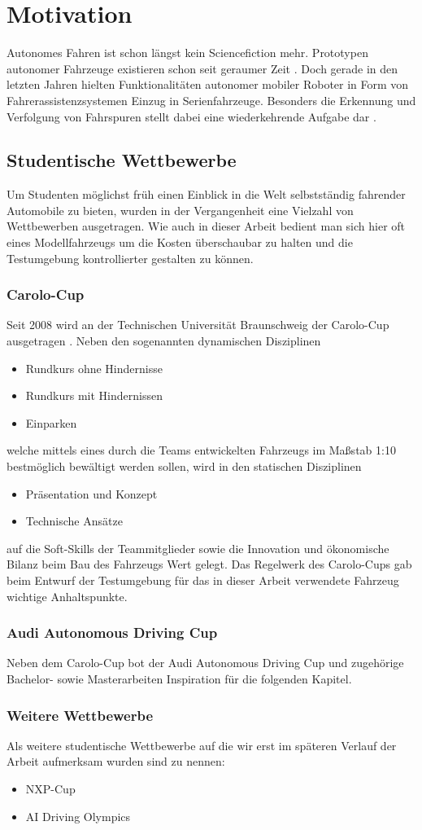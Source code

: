\section{Motivation}
Autonomes Fahren ist schon längst kein Sciencefiction mehr. Prototypen autonomer Fahrzeuge existieren schon seit geraumer Zeit \autocite{AutonomesFahrenSeit}. Doch gerade in den letzten Jahren hielten Funktionalitäten autonomer mobiler Roboter in Form von Fahrerassistenzsystemen Einzug in Serienfahrzeuge. Besonders die Erkennung und Verfolgung von Fahrspuren stellt dabei eine wiederkehrende Aufgabe dar \autocite{kunzeReadingLanesRoad, naroteReviewRecentAdvances2018, guldeSpurhalteassistentenImTest2014}.
\subsection{Studentische Wettbewerbe}
Um Studenten möglichst früh einen Einblick in die Welt selbstständig fahrender Automobile zu bieten, wurden in der Vergangenheit eine Vielzahl von Wettbewerben ausgetragen. Wie auch in dieser Arbeit bedient man sich hier oft eines Modellfahrzeugs um die Kosten überschaubar zu halten und die Testumgebung kontrollierter gestalten zu können.
\subsubsection{Carolo-Cup}
Seit 2008 wird an der Technischen Universität Braunschweig der Carolo-Cup ausgetragen \autocite{CaroloCupCaroloCup}. Neben den sogenannten dynamischen Disziplinen
\begin{itemize}
\item Rundkurs ohne Hindernisse
\item Rundkurs mit Hindernissen
\item Einparken
\end{itemize}
welche mittels eines durch die Teams entwickelten Fahrzeugs im Maßstab 1:10 bestmöglich bewältigt werden sollen, wird in den statischen Disziplinen
\begin{itemize}
\item Präsentation und Konzept
\item Technische Ansätze
\end{itemize}
auf die Soft-Skills der Teammitglieder sowie die Innovation und ökonomische Bilanz beim Bau des Fahrzeugs Wert gelegt. Das Regelwerk des Carolo-Cups \autocite{CaroloCupRegulations2019} gab beim Entwurf der Testumgebung für das in dieser Arbeit verwendete Fahrzeug wichtige Anhaltspunkte.
\subsubsection{Audi Autonomous Driving Cup}
Neben dem Carolo-Cup bot der Audi Autonomous Driving Cup \cite{AudiAutonomousDriving} und zugehörige Bachelor- sowie Masterarbeiten Inspiration für die folgenden Kapitel.
\subsubsection{Weitere Wettbewerbe}
Als weitere studentische Wettbewerbe auf die wir erst im späteren Verlauf der Arbeit aufmerksam wurden sind zu nennen:
\begin{itemize}
\item NXP-Cup \autocite{NXPCupEMEA}
\item AI Driving Olympics \autocite{AIDOAIDriving}
\end{itemize}



